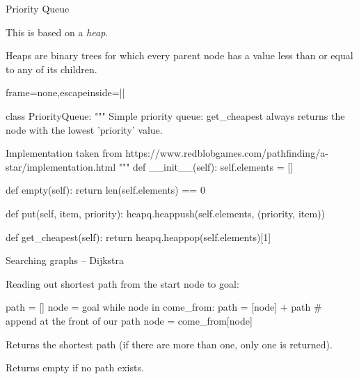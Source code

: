 \documentclass[compress,xcolor=table]{beamer}
\begin{document}
\begin{frame}[fragile]{Priority Queue}

This  is based on a \emph{heap}.

Heaps are binary trees for which every parent node has a value less than or
equal to any of its children.

\begin{pythoncode*}{frame=none,escapeinside=||}

class PriorityQueue:
    """ Simple priority queue: get_cheapest always returns
    the node with the lowest 'priority' value.

    Implementation taken from
    https://www.redblobgames.com/pathfinding/a-star/implementation.html
    """
    def __init__(self):
        self.elements = []
    
    def empty(self):
        return len(self.elements) == 0
    
    def put(self, item, priority):
        heapq.heappush(self.elements, (priority, item))
    
    def get_cheapest(self):
        return heapq.heappop(self.elements)[1]
\end{pythoncode*}


\end{frame}


\begin{frame}[fragile]{Searching graphs -- Dijkstra}

    Reading out shortest path from the start node to goal:

\begin{pythoncode}
path = []
node = goal
while node in come_from:
  path = [node] + path # append at the front of our path
  node = come_from[node]
\end{pythoncode}

    Returns the shortest path (if there are more than one, only one is returned).

    Returns empty if no path exists.

\end{frame}
\end{document}
